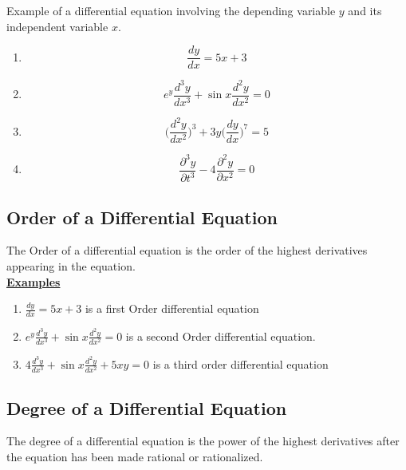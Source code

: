 \documentclass[12pt]{report}
\newcommand{\ubt}[1]{\textbf{\underline{#1}}}
\newcommand{\NI}{\noindent}
\newcommand{\dsp}{\displaystyle}
\begin{document}
	\NI Example of a differential equation involving the depending variable $y$ and its independent variable $x$.
	\begin{enumerate}
		\item 
		\begin{equation}
			\frac{dy}{dx} = 5x + 3
		\end{equation}
	
		\item
			\begin{equation}
				e^y\frac{d^3y}{dx^3} + \sin x \frac{d^2y}{dx^2} = 0
			\end{equation}
		
		\item 
			\begin{equation}
				\Big(\frac{d^2y}{dx^2}\Big)^3 + 3y\Big(\frac{dy}{dx}\Big)^7 = 5
			\end{equation}
		
		\item 
			\begin{equation}
				\frac{\partial^3y}{\partial t^3} - 4 \frac{\partial^2y}{\partial x^2} = 0
			\end{equation}
	\end{enumerate}
	
	\subsection{Order of a Differential Equation}
	The Order of a differential equation is the order of the highest derivatives appearing in the equation.\\
	
	\NI\ubt{Examples}
	\begin{enumerate}
		\item $\dsp \frac{dy}{dx} = 5x + 3$ is a first Order differential equation
		
		\item $\dsp e^y\frac{d^3y}{dx^3} + \sin x \frac{d^2y}{dx^2} = 0$ is a second Order differential equation.
		
		\item $\dsp 4\frac{d^3y}{dx^3} + \sin x \frac{d^2y}{dx^2} + 5xy = 0$ is a third order differential equation
	\end{enumerate}
	
	\subsection{Degree of a Differential Equation}
	The degree of a differential equation is the power of the highest derivatives after the equation has been made rational or rationalized.\\
	
\end{document}
